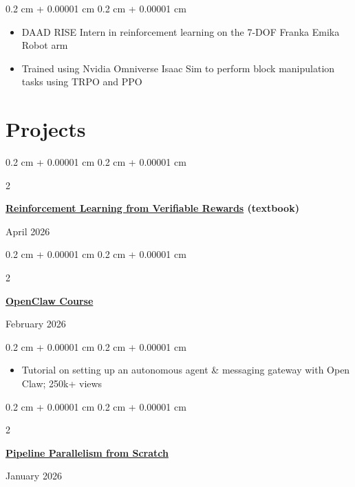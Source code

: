 \documentclass[10pt, letterpaper]{article}
\newenvironment{highlights}{
    \begin{itemize}[
        topsep=0.10 cm,
        parsep=0.10 cm,
        partopsep=0pt,
        itemsep=0pt,
        leftmargin=0.4 cm + 10pt
    ]
}{
    \end{itemize}
}
\newenvironment{onecolentry}{
    \begin{adjustwidth}{
        0.2 cm + 0.00001 cm
    }{
        0.2 cm + 0.00001 cm
    }
}{
    \end{adjustwidth}
}
\newenvironment{twocolentry}[2][]{
    \begin{adjustwidth}{
        0.2 cm + 0.00001 cm
    }{
        0.2 cm + 0.00001 cm
    }
    \def\secondColumn{#2}
    \setcolumnwidth{\fill, 4.5 cm}
    \begin{paracol}{2}
}{
    \switchcolumn \raggedleft \secondColumn
    \end{paracol}
    \end{adjustwidth}
}
\let\hrefWithoutArrow\href
\renewcommand{\href}[2]{\hrefWithoutArrow{#1}{#2}}
\begin{document}
        \vspace{0.09 cm}
        \begin{onecolentry}
            \begin{highlights}
                \item DAAD RISE Intern in reinforcement learning on the 7-DOF Franka Emika Robot arm
                \item Trained using Nvidia Omniverse Isaac Sim to perform block manipulation tasks using TRPO and PPO
            \end{highlights}
        \end{onecolentry}

        \vspace{0.09 cm}

    \section{Projects}
        \begin{twocolentry}{
            April 2026
        }
            \textbf{\href{https://rlvrbook.com}{Reinforcement Learning from Verifiable Rewards} (textbook)}
        \end{twocolentry}

        \vspace{0.09 cm}

        \begin{twocolentry}{
            February 2026
        }
            \textbf{\href{https://www.youtube.com/watch?v=n1sfrc-RjyM}{OpenClaw Course}}
        \end{twocolentry}

        \vspace{0.09 cm}
        \begin{onecolentry}
            \begin{highlights}
                \item Tutorial on setting up an autonomous agent \& messaging gateway with Open Claw; 250k+ views
            \end{highlights}
        \end{onecolentry}
        
        \vspace{0.09 cm}
        
        \begin{twocolentry}{
            January 2026
        }
            \textbf{\href{https://www.youtube.com/watch?v=D5F8kp_azzw}{Pipeline Parallelism from Scratch}}
        \end{twocolentry}
        
\end{document}
